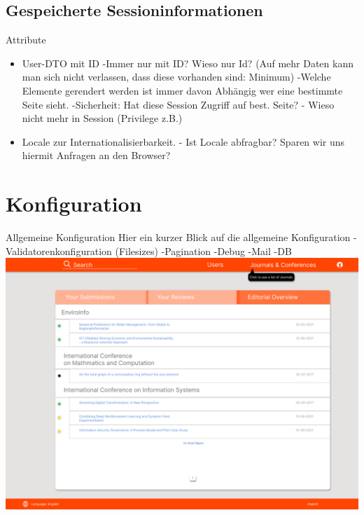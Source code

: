 \documentclass{beamer}
\begin{document}
    \subsection{Gespeicherte Sessioninformationen}
    \begin{frame}{Attribute}
        \begin{itemize}
            \item User-DTO mit ID
            -Immer nur mit ID? Wieso nur Id? (Auf mehr Daten kann man sich nicht verlassen, dass diese vorhanden sind: Minimum)
            -Welche Elemente gerendert werden ist immer davon Abhängig wer eine bestimmte Seite sieht.
            -Sicherheit: Hat diese Session Zugriff auf best. Seite?
            - Wieso nicht mehr in Session (Privilege z.B.)
            \pause
            \item Locale zur Internationalisierbarkeit.
            - Ist Locale abfragbar? Sparen wir uns hiermit Anfragen an den Browser?
        \end{itemize}
    \end{frame}


    \section{Konfiguration}
    \begin{frame}{Allgemeine Konfiguration}
        Hier ein kurzer Blick auf die allgemeine Konfiguration
        -Validatorenkonfiguration (Filesizes)
        -Pagination
        -Debug
        -Mail
        -DB
        \centering
        \includegraphics[height=0.75\textheight]{../../docs/Pflichtenheft/graphics/Homepage-png}
    \end{frame}
\end{document}
